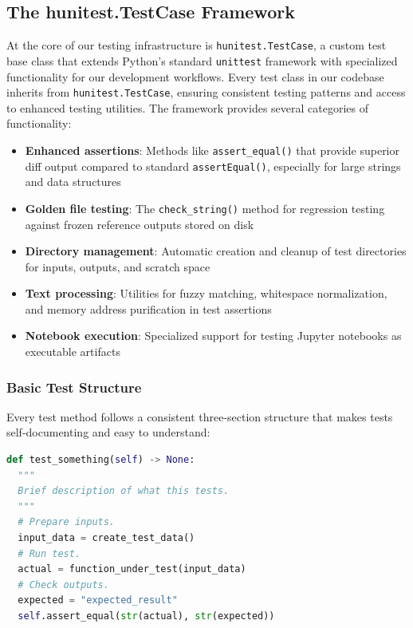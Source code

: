 \subsection{The hunitest.TestCase Framework}
At the core of our testing infrastructure is \texttt{hunitest.TestCase},
a custom test base class that extends Python's standard \texttt{unittest}
framework with specialized functionality for our development workflows.
Every test class in our codebase inherits from \texttt{hunitest.TestCase},
ensuring consistent testing patterns and access to enhanced testing
utilities. The framework provides several categories of functionality:
\begin{itemize}
  \item \textbf{Enhanced assertions}: Methods like \texttt{assert\_equal()}
    that provide superior diff output compared to standard \texttt{assertEqual()},
    especially for large strings and data structures

  \item \textbf{Golden file testing}: The \texttt{check\_string()}
    method for regression testing against frozen reference outputs
    stored on disk

  \item \textbf{Directory management}: Automatic creation and cleanup of
    test directories for inputs, outputs, and scratch space

  \item \textbf{Text processing}: Utilities for fuzzy matching,
    whitespace normalization, and memory address purification in test assertions

  \item \textbf{Notebook execution}: Specialized support for testing Jupyter
    notebooks as executable artifacts
\end{itemize}

\subsubsection{Basic Test Structure}
Every test method follows a consistent three-section structure that
makes tests self-documenting and easy to understand:

\begin{lstlisting}[language=Python]
def test_something(self) -> None:
  """
  Brief description of what this tests.
  """
  # Prepare inputs.
  input_data = create_test_data()
  # Run test.
  actual = function_under_test(input_data)
  # Check outputs.
  expected = "expected_result"
  self.assert_equal(str(actual), str(expected))
\end{lstlisting}

